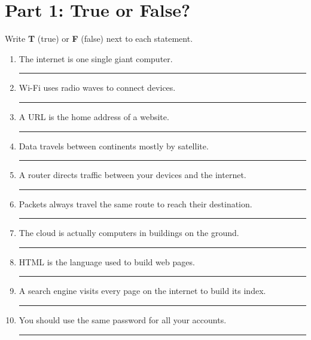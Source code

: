 


\section*{Part 1: True or False?}

\begin{tcolorbox}[enhanced,colback=SkyBlue!10,colframe=InternetBlue,arc=6pt,boxrule=1pt,
  left=10pt,right=10pt,top=8pt,bottom=8pt]

Write \textbf{T} (true) or \textbf{F} (false) next to each statement.

\begin{enumerate}[label=\textbf{\arabic*.}]
  \item The internet is one single giant computer. \hfill \rule{1.5cm}{0.4pt}
  \item Wi-Fi uses radio waves to connect devices. \hfill \rule{1.5cm}{0.4pt}
  \item A URL is the home address of a website. \hfill \rule{1.5cm}{0.4pt}
  \item Data travels between continents mostly by satellite. \hfill \rule{1.5cm}{0.4pt}
  \item A router directs traffic between your devices and the internet. \hfill \rule{1.5cm}{0.4pt}
  \item Packets always travel the same route to reach their destination. \hfill \rule{1.5cm}{0.4pt}
  \item The cloud is actually computers in buildings on the ground. \hfill \rule{1.5cm}{0.4pt}
  \item HTML is the language used to build web pages. \hfill \rule{1.5cm}{0.4pt}
  \item A search engine visits every page on the internet to build its index. \hfill \rule{1.5cm}{0.4pt}
  \item You should use the same password for all your accounts. \hfill \rule{1.5cm}{0.4pt}
\end{enumerate}
\end{tcolorbox}

